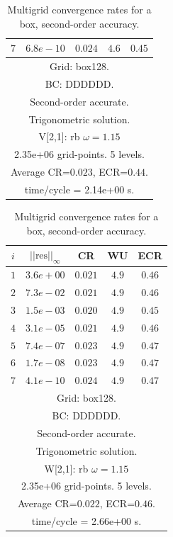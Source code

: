 \begin{table}[hbt]
\begin{center}
\begin{tabular}{|c|c|c|c|c|}
 $ 7$  & $ 6.8e-10$ & $0.024$ & $ 4.6$ & $0.45$ \\ 
\hline 
\multicolumn{5}{|c|}{Grid: box128.}  \\
\multicolumn{5}{|c|}{BC: DDDDDD.}  \\
\multicolumn{5}{|c|}{Second-order accurate.}  \\
\multicolumn{5}{|c|}{Trigonometric solution.}  \\
\multicolumn{5}{|c|}{V[2,1]: rb $\omega=1.15$}  \\
\multicolumn{5}{|c|}{2.35e+06 grid-points. 5 levels.}  \\
\multicolumn{5}{|c|}{Average CR=$0.023$, ECR=$0.44$.}  \\
\multicolumn{5}{|c|}{time/cycle = 2.14e+00 s.}  \\
\hline 
\end{tabular}
\begin{tabular}{|c|c|c|c|c|} \hline 
 $i$   & $\vert\vert\mbox{res}\vert\vert_\infty$  &  CR     &  WU    & ECR  \\   \hline 
 $ 1$  & $ 3.6e+00$ & $0.021$ & $ 4.9$ & $0.46$ \\ 
 $ 2$  & $ 7.3e-02$ & $0.021$ & $ 4.9$ & $0.46$ \\ 
 $ 3$  & $ 1.5e-03$ & $0.020$ & $ 4.9$ & $0.45$ \\ 
 $ 4$  & $ 3.1e-05$ & $0.021$ & $ 4.9$ & $0.46$ \\ 
 $ 5$  & $ 7.4e-07$ & $0.023$ & $ 4.9$ & $0.47$ \\ 
 $ 6$  & $ 1.7e-08$ & $0.023$ & $ 4.9$ & $0.47$ \\ 
 $ 7$  & $ 4.1e-10$ & $0.024$ & $ 4.9$ & $0.47$ \\ 
\hline 
\multicolumn{5}{|c|}{Grid: box128.}  \\
\multicolumn{5}{|c|}{BC: DDDDDD.}  \\
\multicolumn{5}{|c|}{Second-order accurate.}  \\
\multicolumn{5}{|c|}{Trigonometric solution.}  \\
\multicolumn{5}{|c|}{W[2,1]: rb $\omega=1.15$}  \\
\multicolumn{5}{|c|}{2.35e+06 grid-points. 5 levels.}  \\
\multicolumn{5}{|c|}{Average CR=$0.022$, ECR=$0.46$.}  \\
\multicolumn{5}{|c|}{time/cycle = 2.66e+00 s.}  \\
\hline 
\end{tabular}
\end{center}
\caption{Multigrid convergence rates for a box, second-order accuracy.}
 \label{tab:box} 
\end{table}



